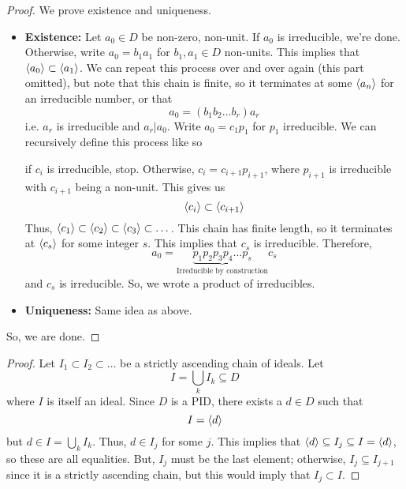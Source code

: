 \documentclass[letterpaper]{article}
\begin{document}
\begin{mdframed}[]
    \begin{proof}
        We prove existence and uniqueness.
        \begin{itemize}
            \item \textbf{Existence:} Let $a_0 \in D$ be non-zero, non-unit. If $a_0$ is irreducible, we're done. Otherwise, write $a_0 = b_1 a_1$ for $b_1, a_1 \in D$ non-units. This implies that $\langle a_0 \rangle \subset \langle a_1 \rangle$. We can repeat this process over and over again (this part omitted), but note that this chain is finite, so it terminates at some $\langle a_n \rangle$ for an irreducible number, or that 
            \[a_0 = (b_1 b_2 \dots b_r) a_r\]
            i.e. $a_r$ is irreducible and $a_r | a_0$. Write $a_0 = c_1 p_1$ for $p_1$ irreducible. We can recursively define this process like so 
            \begin{mdframed}[]
                if $c_i$ is irreducible, stop. Otherwise, $c_i = c_{i + 1} p_{i + 1}$, where $p_{i + 1}$ is irreducible with $c_{i + 1}$ being a non-unit. This gives us
                \[\langle c_i \rangle \subset \langle c_{i + 1} \rangle\]
                Thus, $\langle c_1 \rangle \subset \langle c_2 \rangle \subset \langle c_3 \rangle \subset \dots$. This chain has finite length, so it terminates at $\langle c_s \rangle$ for some integer $s$. This implies that $c_s$ is irreducible. Therefore, 
                \[a_0 = \underbrace{p_1 p_2 p_3 p_4 \dots p_s}_{\text{Irreducible by construction}} c_s\]
                and $c_s$ is irreducible. So, we wrote a product of irreducibles. 
            \end{mdframed}

            \item \textbf{Uniqueness:} Same idea as above. 
        \end{itemize}
        So, we are done. 
    \end{proof}
\end{mdframed}

\begin{mdframed}[]
    \begin{proof}
        Let $I_1 \subset I_2 \subset \dots$ be a strictly ascending chain of ideals. Let
        \[I = \bigcup_{k} I_k \subseteq D\]
        where $I$ is itself an ideal. Since $D$ is a PID, there exists a $d \in D$ such that 
        \[I = \langle d \rangle\]
        but $d \in I = \bigcup_{k} I_k$. Thus, $d \in I_j$ for some $j$. This implies that $\langle d \rangle \subseteq I_j \subseteq I = \langle d \rangle$, so these are all equalities. But, $I_j$ must be the last element; otherwise, $I_j \subseteq I_{j + 1}$ since it is a strictly ascending chain, but this would imply that $I_j \subset I$. 
    \end{proof}
\end{mdframed}
\end{document}
